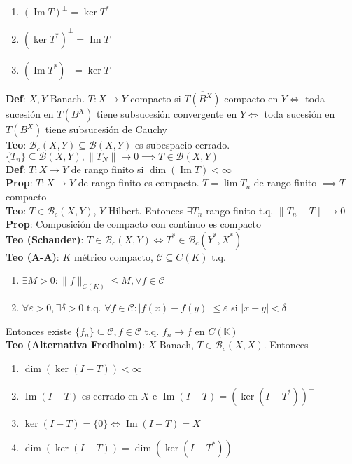 \documentclass[9pt]{extarticle}
\newcommand{\K}{\mathbb{K}}
\begin{document}
\begin{multicols*}{2}
\begin{enumerate}
	\item $(\operatorname{Im}T)^\perp=\operatorname{ker} T^*$
	\item $(\operatorname{ker} T^*)^\perp= \overline{\operatorname{Im}T}$
	\item $(\operatorname{Im}T^*)^\perp=\operatorname{ker}T$
\end{enumerate}
\textbf{Def}: $X,Y$ Banach. $T:X\to Y$ compacto si $\overline{T(B^X)}$ compacto en $Y\iff$ toda sucesión en $T(B^X)$ tiene subsucesión convergente en $Y\iff$ toda sucesión en $T(B^X)$ tiene subsucesión de Cauchy\\
\textbf{Teo}: $\mathcal{B}_c(X,Y)\subseteq \mathcal{B}(X,Y)$ es subespacio cerrado. $\{T_n\}\subseteq \mathcal{B}(X,Y), \|T_N\|\to 0\implies T\in\mathcal{B}(X,Y)$\\
\textbf{Def}: $T:X\to Y$ de rango finito si $\operatorname{dim}(\operatorname{Im} T)<\infty$\\
\textbf{Prop}: $T:X\to Y$ de rango finito es compacto. $T=\lim T_n$ de rango finito $\implies T$ compacto\\
\textbf{Teo}: $T\in\mathcal{B}_c(X,Y)$, $Y$ Hilbert. Entonces $\exists T_n$ rango finito t.q. $\|T_n-T\|\to 0$\\
\textbf{Prop}: Composición de compacto con continuo es compacto\\
\textbf{Teo (Schauder)}: $T\in\mathcal{B}_c(X,Y)\iff T^*\in\mathcal{B}_c(Y^*,X^*)$\\
\textbf{Teo (A-A)}: $K$ métrico compacto, $\mathcal{C}\subseteq C(K)$ t.q.\begin{enumerate}
	\item $\exists M>0:\|f\|_{C(K)}\leq M,\forall f\in \mathcal{C}$
	\item $\forall\varepsilon>0,\exists\delta>0$ t.q. $\forall f\in\mathcal{C}:|f(x)-f(y)|\leq \varepsilon$ si $|x-y|<\delta$
\end{enumerate} Entonces existe $\{f_n\}\subseteq \mathcal{C},f\in\mathcal{C}$ t.q. $f_n\to f$ en $C(\K)$\\
\textbf{Teo (Alternativa Fredholm)}: $X$ Banach, $T\in\mathcal{B}_c(X,X)$. Entonces\begin{enumerate}
	\item $\operatorname{dim}(\operatorname{ker}(I-T))<\infty$
	\item $\operatorname{Im}(I-T)$ es cerrado en $X$ e $\operatorname{Im}(I-T)=(\operatorname{ker}(I-T^*))^\perp$
	\item $\operatorname{ker}(I-T)=\{0\}\iff \operatorname{Im}(I-T)=X$
	\item $\operatorname{dim}(\operatorname{ker}(I-T))=\operatorname{dim}(\operatorname{ker}(I-T^*))$

\end{enumerate}
\end{multicols*}
\end{document}
